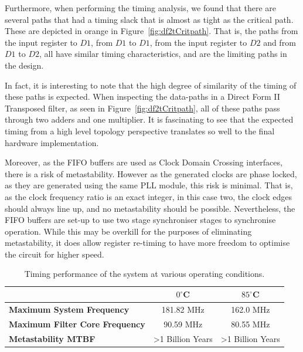 \documentclass[]{article}
\begin{document}
Furthermore, when performing the timing analysis, we found that there are several paths that had a timing slack that is almost as tight as the critical path. These are depicted in orange in Figure~\ref{fig:df2tCritpath}.
That is, the paths from the input register to $D1$, from $D1$ to $D1$, from the input register to $D2$ and from $D1$ to $D2$, all have similar timing characteristics, and are the limiting paths in the design.

In fact, it is interesting to note that the high degree of similarity of the timing of these paths is expected. When inspecting the data-paths in a Direct Form II Transposed filter, as seen in Figure~\ref{fig:df2tCritpath}, all of these paths pass through two adders and one multiplier.
It is fascinating to see that the expected timing from a high level topology perspective translates so well to the final hardware implementation.

Moreover, as the FIFO buffers are used as Clock Domain Crossing interfaces, there is a risk of metastability. However as the generated clocks are phase locked, as they are generated using the same PLL module, this risk is minimal.
That is, as the clock frequency ratio is an exact integer, in this case two, the clock edges should always line up, and no metastability should be possible.
Nevertheless, the FIFO buffers are set-up to use two stage synchroniser stages to synchronise operation. While this may be overkill for the purposes of eliminating metastability, it does allow register re-timing to have more freedom to optimise the circuit for higher speed.

\begin{table}[tbp]
	\caption{Timing performance of the system at various operating conditions.}
	\label{tab:fmax}
	\begin{center}
		\begin{tabular}{l|cc}
		\hline

		\hline
			 										& $0^\circ$C 					& $85^\circ$C 	\\
		\hline
			\textbf{Maximum System Frequency} 		& 181.82 MHz					& 162.0 MHz 	\\
			\textbf{Maximum Filter Core Frequency}	& 90.59 MHz						& 80.55 MHz 	\\
			\textbf{Metastability MTBF}				& \textgreater 1 Billion Years	& \textgreater 1 Billion Years \\
		\hline

		\hline
		\end{tabular}
	\end{center}
\end{table}
\end{document}
